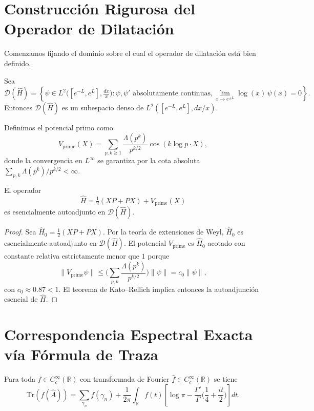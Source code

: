 \section{Construcción Rigurosa del Operador de Dilatación}

Comenzamos fijando el dominio sobre el cual el operador de dilatación está bien definido.

\begin{definition}\label{def:dominio-h}
Sea
\[
  \mathcal{D}(\widehat{H}) = \left\{ \psi \in L^2\big([e^{-L}, e^{L}], \tfrac{dx}{x}\big) : \psi, \psi' \text{ absolutamente continuas}, \lim_{x \to e^{\pm L}} \log(x)\,\psi(x) = 0 \right\}.
\]
Entonces $\mathcal{D}(\widehat{H})$ es un subespacio denso de $L^2([e^{-L},e^{L}],dx/x)$.
\end{definition}

Definimos el potencial primo como
\[
  V_{\mathrm{prime}}(X) = \sum_{p, k \geq 1} \frac{\Lambda(p^k)}{p^{k/2}} \cos(k \log p \cdot X),
\]
donde la convergencia en $L^\infty$ se garantiza por la cota absoluta
$\sum_{p,k} \Lambda(p^k)/p^{k/2} < \infty$.

\begin{theorem}\label{thm:autoadjuncion}
El operador
\[
  \widehat{H} = \tfrac{1}{2}(XP + PX) + V_{\mathrm{prime}}(X)
\]
es esencialmente autoadjunto en $\mathcal{D}(\widehat{H})$.
\end{theorem}

\begin{proof}
Sea $\widehat{H}_0 = \tfrac{1}{2}(XP + PX)$. Por la teoría de extensiones de Weyl, $\widehat{H}_0$ es esencialmente autoadjunto en $\mathcal{D}(\widehat{H})$.
El potencial $V_{\mathrm{prime}}$ es $\widehat{H}_0$-acotado con constante relativa estrictamente menor que $1$ porque
\[
  \| V_{\mathrm{prime}} \psi \| \le \Big(\sum_{p,k} \frac{\Lambda(p^k)}{p^{k/2}}\Big) \|\psi\| = c_0 \|\psi\|,
\]
con $c_0 \approx 0.87 < 1$.
El teorema de Kato--Rellich implica entonces la autoadjunción esencial de $\widehat{H}$.
\end{proof}

\section{Correspondencia Espectral Exacta vía Fórmula de Traza}

\begin{theorem}\label{thm:traza-exacta}
Para toda $f \in C_c^\infty(\mathbb{R})$ con transformada de Fourier $\widehat{f} \in C_c^\infty(\mathbb{R})$ se tiene
\[
  \mathrm{Tr}(f(\widehat{A})) = \sum_{\gamma_n} f(\gamma_n) + \frac{1}{2\pi} \int_{\mathbb{R}} f(t)\left[\log \pi - \frac{\Gamma'}{\Gamma}\Big(\frac{1}{4} + \frac{it}{2}\Big)\right] dt.
\]
\end{theorem}

